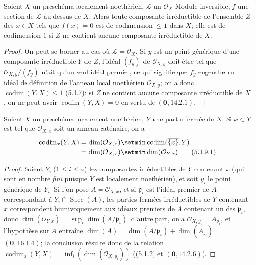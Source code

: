 \begin{corollary}[5.1.8]
\label{IV.2.5.1.8-fr}
Soient $X$ un préschéma localement noethérien, $\mathcal L$ un
$\mathcal O_X$-Module inversible, $f$ une section de $\mathcal L$ au-dessus
de $X$. Alors toute composante irréductible de l'ensemble $Z$
des $x\in X$ tels que $f(x)=0$ est de codimension $\leq1$ dans $X$; elle est
de codimension $1$ si $Z$ ne contient aucune composante irréductible de $X$.
\end{corollary}

\begin{proof}
On peut se borner au cas où $\mathcal L=\mathcal O_X$. Si $y$ est un point
générique d'une composante irréductible $Y$ de $Z$, l'idéal $(f_y)$ de
$\mathcal O_{X,y}$ doit être tel que $\mathcal O_{X,y}/(f_y)$ n'ait qu'un
seul idéal premier, ce qui signifie que $f_y$ engendre un idéal de définition
de l'anneau local noethérien $\mathcal O_{X,y}$; on a donc
$\operatorname{codim}(Y,X)\leq1$ (5.1.7); si $Z$ ne contient aucune
composante irréductible de $X$, on ne peut avoir
$\operatorname{codim}(Y,X)=0$ en vertu de $(\mathbf{0},14.2.1)$.
\end{proof}

\begin{proposition}[5.1.9]
\label{IV.2.5.1.9-fr}
Soient $X$ un préschéma localement noethérien, $Y$ une partie fermée de $X$.
Si $x\in Y$ est tel que $\mathcal O_{X,x}$ soit un anneau caténaire, on a
\begin{align}
\operatorname{codim}_x(Y,X)
&=\dim(\mathcal O_{X,x})\setmin\operatorname{codim}(\overline{\{x\}},Y)\notag\\
&=\dim(\mathcal O_{X,x})\setmin\dim(\mathcal O_{Y,x})
\tag{5.1.9.1}\label{IV.2.5.1.9.1-fr}
\end{align}
\end{proposition}

\begin{proof}
Soient $Y_i$ ($1\leq i\leq n$) les composantes irréductibles de $Y$
contenant $x$ (qui sont en nombre \emph{fini} puisque $Y$ est localement
noethérien), et soit $y_i$ le point générique de $Y_i$. Si l'on pose
$A=\mathcal O_{X,x}$, et si $\mathfrak p_i$ est l'idéal premier de $A$
correspondant à $Y_i\cap\operatorname{Spec}(A)$, les parties fermées
irréductibles de $Y$ contenant $x$ correspondent biunivoquement aux idéaux
premiers de $A$ contenant un des $\mathfrak p_i$, donc
$\dim(\mathcal O_{Y,x})=\sup_i\dim(A/\mathfrak p_i)$; d'autre part, on a
$\mathcal O_{X,y_i}=A_{\mathfrak p_i}$, et l'hypothèse sur $A$ entraîne
$\dim(A)=\dim(A/\mathfrak p_i)+\dim(A_{\mathfrak p_i})$ $(\mathbf{0},16.1.4)$; la
conclusion résulte donc de la relation
$\operatorname{codim}_x(Y,X)=\inf_i(\dim(\mathcal O_{X,y_i}))$ ((5.1.2) et
$(\mathbf{0},14.2.6)$).
\end{proof}

